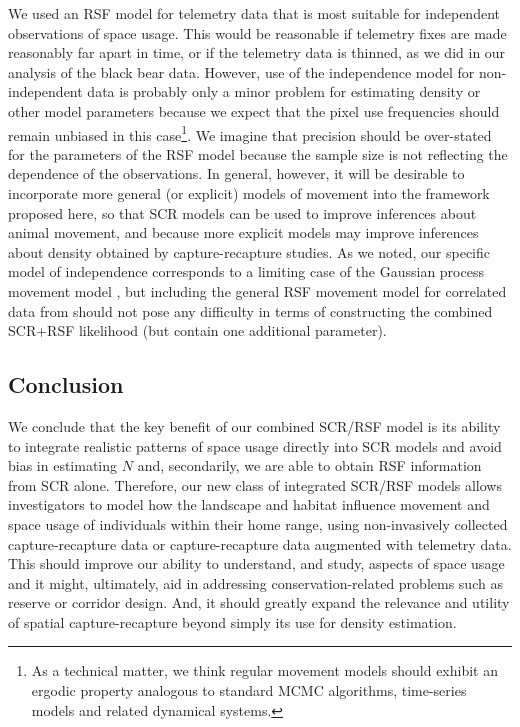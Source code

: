 \documentclass[12pt]{article}
\begin{document}
We used an RSF model for telemetry data that is most suitable for
independent observations of space usage.  This would be reasonable if
telemetry fixes are made reasonably far apart in time, or if the
telemetry data %
is thinned, as we did in our analysis of the
black bear data.  However, use of the independence model for
non-independent data is probably only a minor problem for estimating
density or other model parameters because we expect that the pixel use
frequencies should remain unbiased in this case\footnote{As a
  technical matter, we think regular movement models should exhibit an
  ergodic property analogous to standard MCMC algorithms, time-series
  models and related dynamical systems.}.  We imagine that precision
should be over-stated for the parameters of the RSF model because the
sample size is not reflecting the dependence of the observations.  In
general, however, it will be desirable to incorporate more general (or
explicit) models of movement into the framework proposed here, so that
SCR models can be used to improve inferences about animal movement,
and because more explicit models may improve inferences about density
obtained by capture-recapture studies.  As we noted, our specific model
of independence corresponds to a limiting case of the Gaussian process
movement model \citep{johnson_etal:2008}, but including the general
RSF movement model for correlated data from \citet{johnson_etal:2008}
should not pose any difficulty in terms of constructing the combined
SCR+RSF likelihood (but contain one additional parameter).



\subsection{Conclusion}

We conclude that the key benefit of our combined SCR/RSF model is its
ability to integrate realistic patterns of space usage directly into SCR
models and avoid
bias in estimating $N$ and, secondarily, we
are able to obtain RSF information from SCR alone.  Therefore, our new
class of integrated SCR/RSF models allows investigators to model how
the landscape and habitat influence movement and space usage of
individuals within their home range, using non-invasively collected
capture-recapture data or capture-recapture data augmented with
telemetry data.  This should improve our ability to understand, and
study, aspects of space usage and it might, ultimately, aid in
addressing conservation-related problems such as reserve or corridor
design. And, it should greatly expand the relevance and utility of
spatial capture-recapture beyond simply its use for density
estimation.
\end{document}
